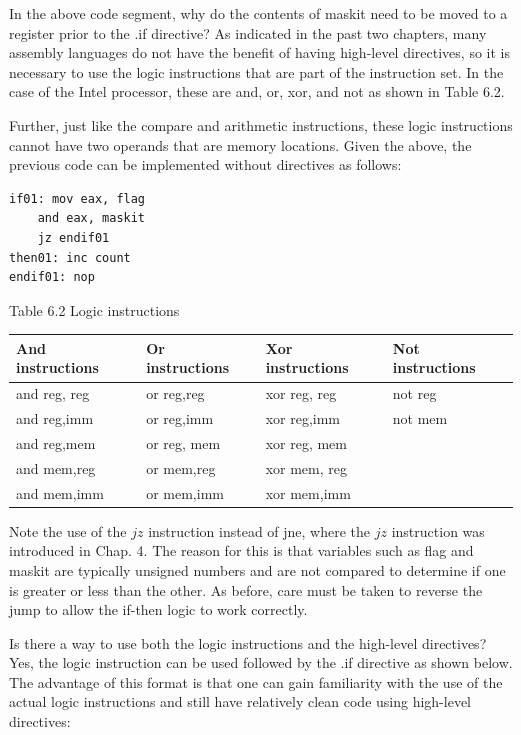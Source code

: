 \documentclass[10pt]{book}
\begin{document}
In the above code segment, why do the contents of maskit need to be moved to a register prior to the .if directive? As indicated in the past two chapters, many assembly languages do not have the benefit of having high-level directives, so it is necessary to use the logic instructions that are part of the instruction set. In the case of the Intel processor, these are and, or, xor, and not as shown in Table 6.2.

Further, just like the compare and arithmetic instructions, these logic instructions cannot have two operands that are memory locations. Given the above, the previous code can be implemented without directives as follows:

\begin{verbatim}
if01: mov eax, flag
    and eax, maskit
    jz endif01
then01: inc count
endif01: nop
\end{verbatim}

Table 6.2 Logic instructions

\begin{center}
\begin{tabular}{|llll|}
\hline
And instructions & Or instructions & Xor instructions & Not instructions \\
\hline
and reg, reg & or reg,reg & xor reg, reg & not reg \\
and reg,imm & or reg,imm & xor reg,imm & not mem \\
and reg,mem & or reg, mem & xor reg, mem &  \\
and mem,reg & or mem,reg & xor mem, reg &  \\
and mem,imm & or mem,imm & xor mem,imm &  \\
\hline
\end{tabular}
\end{center}

Note the use of the $j z$ instruction instead of jne, where the $j z$ instruction was introduced in Chap. 4. The reason for this is that variables such as flag and maskit are typically unsigned numbers and are not compared to determine if one is greater or less than the other. As before, care must be taken to reverse the jump to allow the if-then logic to work correctly.


Is there a way to use both the logic instructions and the high-level directives? Yes, the logic instruction can be used followed by the .if directive as shown below. The advantage of this format is that one can gain familiarity with the use of the actual logic instructions and still have relatively clean code using high-level directives:
\end{document}
